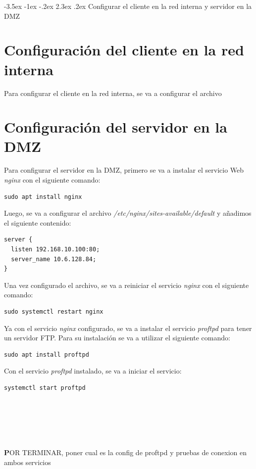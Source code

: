 \documentclass[11pt]{report}
\makeatletter
\renewcommand\chapter{\@startsection{chapter}{0}{\z@}%
    {-3.5ex \@plus -1ex \@minus -.2ex}%
    {2.3ex \@plus.2ex}%
    {\normalfont\Large\bfseries}}
\makeatother
\begin{document}
\cleardoublepage

\chapter{Configurar el cliente en la red interna y servidor en la DMZ}
\section{Configuración del cliente en la red interna}
Para configurar el cliente en la red interna, se va a configurar el archivo

\section{Configuración del servidor en la DMZ}
Para configurar el servidor en la DMZ, primero se va a instalar el servicio Web
\emph{nginx} con el siguiente comando:
\begin{BVerbatim}
sudo apt install nginx
\end{BVerbatim}

Luego, se va a configurar el archivo \emph{/etc/nginx/sites-available/default} y añadimos
el siguiente contenido:
\begin{verbatim}
server {
  listen 192.168.10.100:80;
  server_name 10.6.128.84;
}
\end{verbatim}

Una vez configurado el archivo, se va a reiniciar el servicio \emph{nginx} con el siguiente comando: \\
\begin{BVerbatim}
sudo systemctl restart nginx
\end{BVerbatim}

Ya con el servicio \emph{nginx} configurado, se va a instalar el servicio \emph{proftpd} para tener un servidor FTP. Para su instalación
se va a utilizar el siguiente comando:
\begin{BVerbatim}
sudo apt install proftpd
\end{BVerbatim}

Con el servicio \emph{proftpd} instalado, se va a iniciar el servicio:
\begin{BVerbatim}
systemctl start proftpd
\end{BVerbatim}
\\ 
\\ 
\\ 
\\
\\
\textbf POR TERMINAR, poner cual es la config de proftpd y pruebas de conexion en ambos servicios
\end{document}
